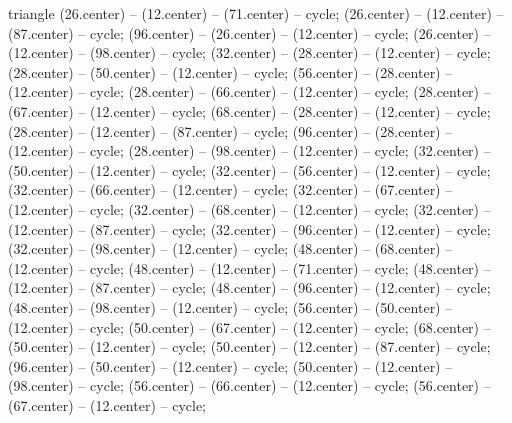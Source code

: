 \begin{pgfonlayer}{triangle}
 (26.center) -- (12.center) -- (71.center) -- cycle; 
 (26.center) -- (12.center) -- (87.center) -- cycle; 
 (96.center) -- (26.center) -- (12.center) -- cycle; 
 (26.center) -- (12.center) -- (98.center) -- cycle; 
 (32.center) -- (28.center) -- (12.center) -- cycle; 
 (28.center) -- (50.center) -- (12.center) -- cycle; 
 (56.center) -- (28.center) -- (12.center) -- cycle; 
 (28.center) -- (66.center) -- (12.center) -- cycle; 
 (28.center) -- (67.center) -- (12.center) -- cycle; 
 (68.center) -- (28.center) -- (12.center) -- cycle; 
 (28.center) -- (12.center) -- (87.center) -- cycle; 
 (96.center) -- (28.center) -- (12.center) -- cycle; 
 (28.center) -- (98.center) -- (12.center) -- cycle; 
 (32.center) -- (50.center) -- (12.center) -- cycle; 
 (32.center) -- (56.center) -- (12.center) -- cycle; 
 (32.center) -- (66.center) -- (12.center) -- cycle; 
 (32.center) -- (67.center) -- (12.center) -- cycle; 
 (32.center) -- (68.center) -- (12.center) -- cycle; 
 (32.center) -- (12.center) -- (87.center) -- cycle; 
 (32.center) -- (96.center) -- (12.center) -- cycle; 
 (32.center) -- (98.center) -- (12.center) -- cycle; 
 (48.center) -- (68.center) -- (12.center) -- cycle; 
 (48.center) -- (12.center) -- (71.center) -- cycle; 
 (48.center) -- (12.center) -- (87.center) -- cycle; 
 (48.center) -- (96.center) -- (12.center) -- cycle; 
 (48.center) -- (98.center) -- (12.center) -- cycle; 
 (56.center) -- (50.center) -- (12.center) -- cycle; 
 (50.center) -- (67.center) -- (12.center) -- cycle; 
 (68.center) -- (50.center) -- (12.center) -- cycle; 
 (50.center) -- (12.center) -- (87.center) -- cycle; 
 (96.center) -- (50.center) -- (12.center) -- cycle; 
 (50.center) -- (12.center) -- (98.center) -- cycle; 
 (56.center) -- (66.center) -- (12.center) -- cycle; 
 (56.center) -- (67.center) -- (12.center) -- cycle; 

\end{pgfonlayer}

